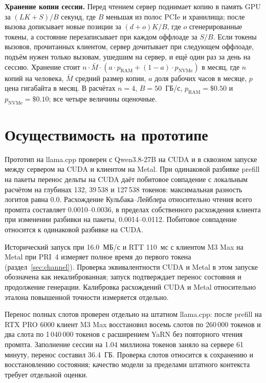 \textbf{Хранение копии сессии.} Перед чтением сервер поднимает копию в память GPU за $(L K + S) / B$ секунд, где $B$
меньшая из полос PCIe и хранилища; после вызова дописывает новые позиции за $(d + o) K / B$, где $o$ сгенерированные
токены, а состояние перезаписывает при каждом оффлоаде за $S / B$. Если токены вызовов, прочитанных клиентом, сервер
дочитывает при следующем оффлоаде, подъём нужен только вызовам, ушедшим на сервер, и ещё один раз за день на
сессию. Хранение стоит $n \cdot \bar{M} \cdot (a \cdot p_{\text{RAM}} + (1 - a) \cdot p_{\text{NVMe}})$ в месяц, где
$n$ копий на человека, $\bar{M}$ средний размер копии, $a$ доля рабочих часов в месяце, $p$ цена гигабайта в месяц.
В расчётах $n = 4$, $B = 50$~ГБ/с, $p_{\text{RAM}} = \$0.50$ и $p_{\text{NVMe}} = \$0.10$; все четыре величины оценочные.

\section{Осуществимость на прототипе}
\label{app:prototype}

Прототип на llama.cpp \cite{llamacpp} проверен с Qwen3.8-27B на CUDA и в сквозном запуске
между сервером на CUDA и клиентом на Metal. При одинаковой разбивке prefill на пакеты перенос дельты
на CUDA даёт побитовое совпадение с локальным расчётом на глубинах 132, 39\,538 и 127\,538 токенов:
максимальная разность логитов равна 0.0. Расхождение Кульбака--Лейблера относительно чтения всего
промпта составляет 0.0010--0.0036, в пределах собственного расхождения клиента при изменении
разбивки на пакеты, 0.0014--0.0112. Побитовое совпадение относится к одинаковой разбивке на CUDA.

Исторический запуск при 16.0~МБ/с и RTT 110~мс с клиентом M3 Max на Metal при PRI~4 измеряет полное время до первого токена
(раздел~\ref{sec:channel}). Проверка эквивалентности CUDA и Metal в этом запуске обозначена
как некалиброванная; запуск подтверждает перенос состояния и продолжение генерации.
Калибровка расхождений CUDA и Metal относительно эталона повышенной точности измеряется отдельно.

Перенос полных слотов проверен отдельно на штатном llama.cpp: после prefill на RTX PRO 6000
клиент M3 Max восстановил восемь слотов по 260\,000 токенов и два слота по 1\,040\,000 токенов
с расширением YaRN без повторного чтения промпта. Заполнение сессии на 1.04 миллиона токенов
заняло на сервере 61 минуту, перенос составил 36.4~ГБ. Проверка слотов относится к сохранению
и восстановлению состояния; качество модели за пределами штатного контекста требует отдельной оценки.

